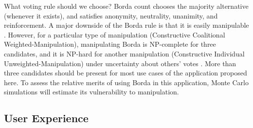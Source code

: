 \documentclass[12pt,letterpaper]{article} %
\begin{document}
What voting rule should we choose? Borda count chooses the majority alternative (whenever it exists), and satisfies anonymity, neutrality, unanimity, and reinforcement. A major downside of the Borda rule is that it is easily manipulable \citep{bartholdi1989computational}. However, for a particular type of manipulation (Constructive Coalitional Weighted-Manipulation), manipulating Borda is NP-complete for three candidates, and it is NP-hard for another manipulation (Constructive Individual Unweighted-Manipulation) under uncertainty about others' votes \citep{conitzer2007elections}. More than three candidates should be present for most use cases of the application proposed here. To assess the relative merits of using Borda in this application, Monte Carlo simulations will estimate its vulnerability to manipulation.


\subsection{User Experience}
\end{document}
